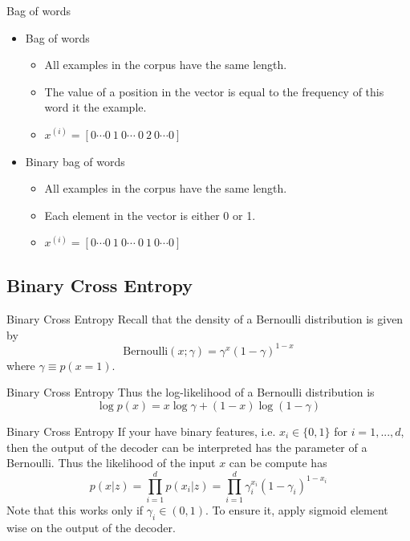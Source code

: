 \documentclass{beamer}
\newcommand{\bernoulli}{\mathrm{Bernoulli}}
\begin{document}
\begin{frame}[fragile]{Bag of words}
\begin{itemize}
	\item Bag of words
	\begin{itemize}
		\item All examples in the corpus have the same length. 
		\item The value of a position in the vector is equal to the frequency of this word it the example.
		\item $x^{(i)}=[0\cdots0~1~0\cdots~0~2~0\cdots0]$
	\end{itemize}
	\item Binary bag of words
	\begin{itemize}
		\item All examples in the corpus have the same length. 
		\item Each element in the vector is either 0 or 1.
		\item $x^{(i)}=[0\cdots0~1~0\cdots~0~1~0\cdots0]$
	\end{itemize}
\end{itemize}
\end{frame}

\subsection{Binary Cross Entropy}

\begin{frame}{Binary Cross Entropy}
	Recall that the density of a Bernoulli distribution is given by 
	\begin{equation}
	\bernoulli(x;\gamma) = \gamma^x(1-\gamma)^{1-x}
	\end{equation}
	where $\gamma\equiv p(x=1)$.
\end{frame}

\begin{frame}{Binary Cross Entropy}
	Thus the log-likelihood of a Bernoulli distribution is
	\begin{equation}
	\log p(x) = x\log\gamma + (1-x)\log(1-\gamma)
	\end{equation}
\end{frame}

\begin{frame}[fragile]{Binary Cross Entropy}
	If your have binary features, i.e. $x_i\in \{0,1\}$ for $i=1,...,d$, then the output of the decoder can be interpreted has the parameter of a Bernoulli. Thus the likelihood of the input $x$ can be compute has 
	\begin{equation}
	p(x|z)=\prod_{i=1}^dp(x_i|z) = \prod_{i=1}^d\gamma_i^{x_i}(1-\gamma_i)^{1-x_i}
	\end{equation}
	Note that this works only if $\gamma_i\in (0, 1)$. To ensure it, apply sigmoid element wise on the output of the decoder.
\end{frame}
\end{document}
